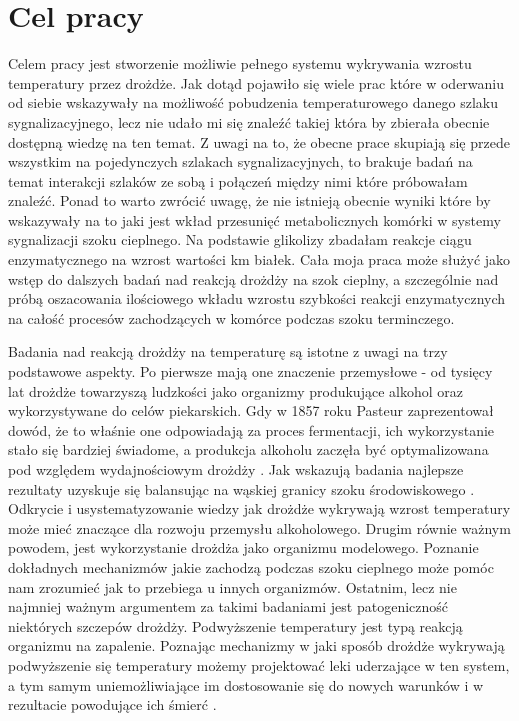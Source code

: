 \documentclass{pracamgr}
\begin{document}
% 
% 
% 


% 




\chapter{Cel pracy}

Celem pracy jest stworzenie możliwie pełnego systemu wykrywania wzrostu temperatury przez drożdże. 
Jak dotąd pojawiło się wiele prac które w oderwaniu od siebie wskazywały na możliwość pobudzenia
temperaturowego danego szlaku sygnalizacyjnego, lecz nie udało mi się znaleźć takiej która by 
zbierała obecnie dostępną wiedzę na ten temat. Z uwagi na to, że obecne prace skupiają się
przede wszystkim na pojedynczych szlakach sygnalizacyjnych, to brakuje badań na temat 
interakcji szlaków ze sobą i połączeń między nimi które próbowałam znaleźć. Ponad to warto zwrócić uwagę, że
nie istnieją obecnie wyniki które by wskazywały na to jaki jest wkład przesunięć metabolicznych
komórki w systemy sygnalizacji szoku cieplnego. Na podstawie glikolizy zbadałam reakcje ciągu 
enzymatycznego na wzrost wartości km białek. Cała moja praca może służyć jako wstęp do dalszych badań
nad reakcją drożdży na szok cieplny, a szczególnie nad próbą oszacowania ilościowego wkładu 
wzrostu szybkości reakcji enzymatycznych na całość procesów zachodzących w komórce podczas szoku terminczego.

Badania nad reakcją drożdży na temperaturę są istotne z uwagi na trzy podstawowe aspekty. Po pierwsze 
mają one znaczenie przemysłowe - od tysięcy lat drożdże towarzyszą ludzkości jako organizmy 
produkujące alkohol oraz wykorzystywane do celów piekarskich. Gdy w 1857 roku Pasteur 
zaprezentował dowód, że to właśnie one odpowiadają za proces fermentacji, ich wykorzystanie 
stało się bardziej świadome, a produkcja alkoholu zaczęła być optymalizowana 
pod względem wydajnościowym drożdży \cite{100years}. Jak wskazują badania najlepsze rezultaty 
uzyskuje się balansując na wąskiej granicy szoku środowiskowego \cite{Stresstolerance}. Odkrycie i usystematyzowanie wiedzy 
jak drożdże wykrywają wzrost temperatury może mieć znaczące dla rozwoju przemysłu alkoholowego. 
Drugim równie ważnym powodem, jest wykorzystanie drożdża jako organizmu modelowego. Poznanie dokładnych mechanizmów
jakie zachodzą podczas szoku cieplnego może pomóc nam zrozumieć jak to przebiega u innych organizmów. Ostatnim, lecz 
nie najmniej ważnym argumentem za takimi badaniami jest patogeniczność niektórych szczepów drożdży. 
Podwyższenie temperatury jest typą reakcją organizmu na zapalenie. Poznając mechanizmy w jaki sposób 
drożdże wykrywają podwyższenie się temperatury możemy projektować leki uderzające w ten system, a tym samym
uniemożliwiające im dostosowanie się do nowych warunków i w rezultacie powodujące ich śmierć \cite{Drugs}.
\end{document}
